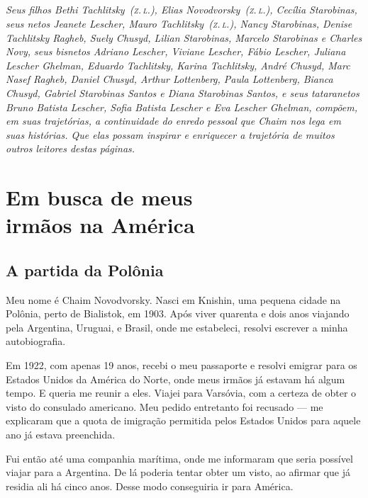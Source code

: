\chapter*{}
\thispagestyle{empty}

\vfill
\begin{flushright}
\small
\textit{Seus filhos Bethi Tachlitsky~(\textsc{z.\,l.}), Elias Novodvorsky~(\textsc{z.\,l.}), Cecília Starobinas, seus netos Jeanete Lescher, Mauro Tachlitsky~(\textsc{z.\,l.}), Nancy Starobinas, Denise Tachlitsky Ragheb, Suely Chusyd, Lilian Starobinas, Marcelo Starobinas e Charles Novy, seus bisnetos Adriano Lescher, Viviane Lescher, Fábio Lescher, Juliana Lescher Ghelman, Eduardo Tachlitsky, Karina Tachlitsky, André Chusyd, Marc Nasef Ragheb, Daniel Chusyd, Arthur Lottenberg, Paula Lottenberg, Bianca Chusyd, Gabriel Starobinas Santos e Diana Starobinas Santos, e seus tataranetos Bruno Batista Lescher, Sofia Batista Lescher e Eva Lescher Ghelman, compõem, em suas trajetórias, a continuidade do enredo pessoal que Chaim nos lega em suas histórias. Que elas possam inspirar e enriquecer a trajetória de muitos outros leitores destas páginas.} 
\end{flushright}

\part[Em busca de meus irmãos na América]{Em busca de meus\\irmãos na América}
\chapter{A partida da Polônia}

Meu nome é Chaim Novodvorsky. Nasci em Knishin, uma pequena cidade na
Polônia, perto de Bialistok, em 1903. Após viver quarenta e dois anos viajando pela
Argentina, Uruguai, e Brasil, onde me estabeleci, resolvi escrever a minha
autobiografia.


Em 1922, com apenas 19 anos, recebi o meu passaporte e resolvi emigrar
para os Estados Unidos da América do Norte, onde meus irmãos já estavam
há algum tempo. E queria me reunir a eles. Viajei para Varsóvia, com
a certeza de obter o visto do consulado americano. Meu pedido entretanto foi recusado --- me explicaram 
que a quota de imigração permitida pelos Estados Unidos para 
aquele ano já estava preenchida.

Fui então até uma companhia marítima, onde me informaram que seria possível
viajar para a Argentina. De lá poderia tentar obter um visto, ao afirmar que já residia ali há cinco anos. Desse modo conseguiria ir para América.

